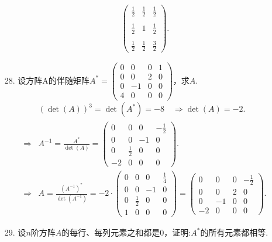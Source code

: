 \documentclass{article}
\begin{document}
\begin{enumerate}
\begin{align*}
\begin{pmatrix}
            \displaystyle{\frac{1}{2}} & \displaystyle{\frac{1}{2}} & \displaystyle{\frac{1}{2}}\\
            & & \\
            \displaystyle{\frac{1}{2}} & 1 & \displaystyle{\frac{1}{2}}\\
            & & \\
            \displaystyle{\frac{1}{2}} & \displaystyle{\frac{1}{2}} & \displaystyle{\frac{3}{2}}
        \end{pmatrix}.
    \end{align*}
    \item [28.]设方阵A的伴随矩阵$A^*=
    \begin{pmatrix}
        0 & 0 & 0 & 1\\
        0 & 0 & 2 & 0\\
        0 & -1& 0 & 0\\
        4 & 0 & 0 & 0
    \end{pmatrix}$，求$A$.
    \begin{align*}
        &{\left(\det(A)\right)}^3=\det(A^*)=-8\quad \Rightarrow \det(A)=-2.\\
        \Rightarrow
        &A^{-1}=\displaystyle{\frac{A^*}{\det(A)}}=
        \begin{pmatrix}
            0 & 0 & 0 & -\frac{1}{2}\\
            0 & 0 & -1 & 0\\
            0 & \frac{1}{2}& 0 & 0\\
            -2 & 0 & 0 & 0
        \end{pmatrix}.\\
        \Rightarrow
        &A=\displaystyle{\frac{{(A^{-1})}^*}{\det(A^{-1})}}=-2\cdot 
        \begin{pmatrix}
            0 & 0 & 0 & \frac{1}{4}\\
            0 & 0 & -1 & 0\\
            0 & \frac{1}{2}& 0 & 0\\
            1 & 0 & 0 & 0
        \end{pmatrix}=
        \begin{pmatrix}
            0 & 0 & 0 & -\frac{1}{2}\\
            0 & 0 & 2 & 0\\
            0 & -1& 0 & 0\\
            -2 & 0 & 0 & 0
        \end{pmatrix}.
    \end{align*}
    \item [29.]设$n$阶方阵$A$的每行、每列元素之和都是0，证明:$A^*$的所有元素都相等.

\end{enumerate}
\end{document}

